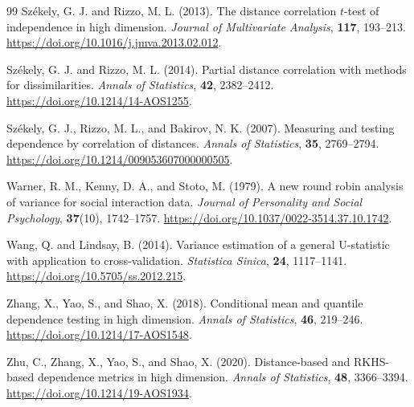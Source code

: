 \documentclass[11pt]{article}
\theoremstyle{plain}
\theoremstyle{definition}
\theoremstyle{remark}
\begin{document}
\begin{thebibliography}{99}
Sz\'ekely, G. J. and Rizzo, M. L. (2013).
The distance correlation $t$-test of independence in high dimension.
\emph{Journal of Multivariate Analysis}, \textbf{117}, 193--213.
\url{https://doi.org/10.1016/j.jmva.2013.02.012}.

Sz\'ekely, G. J. and Rizzo, M. L. (2014).
Partial distance correlation with methods for dissimilarities.
\emph{Annals of Statistics}, \textbf{42}, 2382--2412.
\url{https://doi.org/10.1214/14-AOS1255}.

Sz\'ekely, G. J., Rizzo, M. L., and Bakirov, N. K. (2007).
Measuring and testing dependence by correlation of distances.
\emph{Annals of Statistics}, \textbf{35}, 2769--2794.
\url{https://doi.org/10.1214/009053607000000505}.

Warner, R. M., Kenny, D. A., and Stoto, M. (1979).
A new round robin analysis of variance for social interaction data.
\emph{Journal of Personality and Social Psychology}, \textbf{37}(10),
1742--1757.
\url{https://doi.org/10.1037/0022-3514.37.10.1742}.

Wang, Q. and Lindsay, B. (2014).
Variance estimation of a general U-statistic with application to
cross-validation.
\emph{Statistica Sinica}, \textbf{24}, 1117--1141.
\url{https://doi.org/10.5705/ss.2012.215}.

Zhang, X., Yao, S., and Shao, X. (2018).
Conditional mean and quantile dependence testing in high dimension.
\emph{Annals of Statistics}, \textbf{46}, 219--246.
\url{https://doi.org/10.1214/17-AOS1548}.

Zhu, C., Zhang, X., Yao, S., and Shao, X. (2020).
Distance-based and RKHS-based dependence metrics in high dimension.
\emph{Annals of Statistics}, \textbf{48}, 3366--3394.
\url{https://doi.org/10.1214/19-AOS1934}.

\end{thebibliography}
\end{document}
